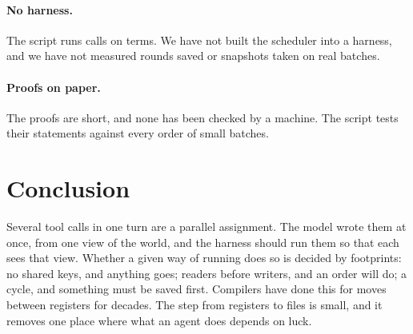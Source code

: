 \documentclass[acmsmall,nonacm,screen]{acmart}
\begin{document}
\paragraph{No harness.} The script runs calls on terms. We have not built the scheduler into
a harness, and we have not measured rounds saved or snapshots taken on real batches.

\paragraph{Proofs on paper.} The proofs are short, and none has been checked by a machine.
The script tests their statements against every order of small batches.

\section{Conclusion}

Several tool calls in one turn are a parallel assignment. The model wrote them at once, from
one view of the world, and the harness should run them so that each sees that view. Whether
a given way of running does so is decided by footprints: no shared keys, and anything goes;
readers before writers, and an order will do; a cycle, and something must be saved first.
Compilers have done this for moves between registers for decades. The step from registers
to files is small, and it removes one place where what an agent does depends on luck.



\end{document}

